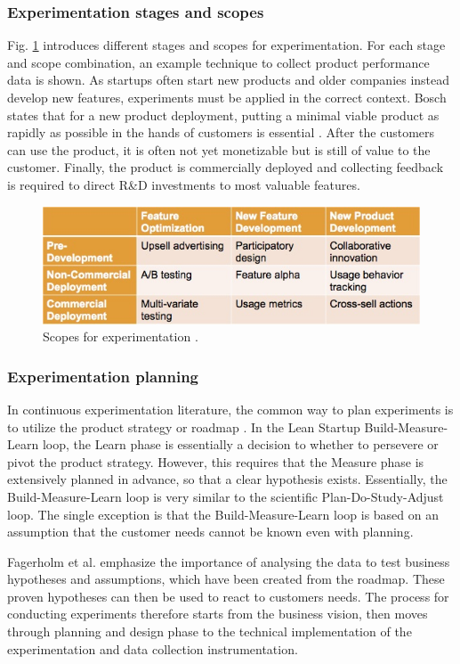 \documentclass[english]{tktltiki2}
\theoremstyle{definition}
\theoremstyle{remark}
\begin{document}
\subsubsection{Experimentation stages and scopes}
Fig. \ref{fig5} introduces different stages and scopes for experimentation. For each stage and scope combination, an example technique to collect product performance data is shown. As startups often start new products and older companies instead develop new features, experiments must be applied in the correct context. Bosch states that for a new product deployment, putting a minimal viable product as rapidly as possible in the hands of customers is essential \cite{bosch2012building}. After the customers can use the product, it is often not yet monetizable but is still of value to the customer. Finally, the product is commercially deployed and collecting feedback is required to direct R\&D investments to most valuable features.
\begin{figure}[h]
	\centering
	\includegraphics[width=5.0in]{scopes.jpg}
	\caption{Scopes for experimentation \cite{bosch2012building}.}
	\label{fig5}
\end{figure}

\subsubsection{Experimentation planning}
In continuous experimentation literature, the common way to plan experiments is to utilize the product strategy or roadmap \cite{ries2011lean, fagerholm2012building}. In the Lean Startup Build-Measure-Learn loop, the Learn phase is essentially a decision to whether to persevere or pivot the product strategy. However, this requires that the Measure phase is extensively planned in advance, so that a clear hypothesis exists. Essentially, the Build-Measure-Learn loop is very similar to the scientific Plan-Do-Study-Adjust loop. The single exception is that the Build-Measure-Learn loop is based on an assumption that the customer needs cannot be known even with planning. 

Fagerholm et al. emphasize the importance of analysing the data to test business hypotheses and assumptions, which have been created from the roadmap. These proven hypotheses can then be used to react to customers needs. The process for conducting experiments therefore starts from the business vision, then moves through planning and design phase to the technical implementation of the experimentation and data collection instrumentation.  
\end{document}
